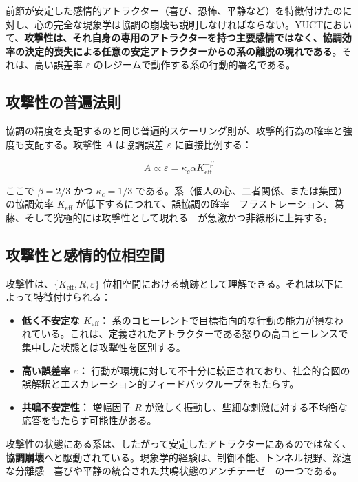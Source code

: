 \documentclass[12pt,a4paper]{article}
\begin{document}
	前節が安定した感情的アトラクター（喜び、恐怖、平静など）を特徴付けたのに対し、心の完全な現象学は協調の崩壊も説明しなければならない。YUCTにおいて、\textbf{攻撃性は、それ自身の専用のアトラクターを持つ主要感情ではなく、協調効率の決定的喪失による任意の安定アトラクターからの系の離脱の現れである}。それは、高い誤差率 \(\varepsilon\) のレジームで動作する系の行動的署名である。
	
	\subsection{攻撃性の普遍法則}
	
	協調の精度を支配するのと同じ普遍的スケーリング則が、攻撃的行為の確率と強度も支配する。攻撃性 \(A\) は協調誤差 \(\varepsilon\) に直接比例する：
	
	\begin{equation}
		A \propto \varepsilon = \kappa_c \alpha K_{\mathrm{eff}}^{-\beta}
	\end{equation}
	
	ここで \(\beta = 2/3\) かつ \(\kappa_c = 1/3\) である。系（個人の心、二者関係、または集団）の協調効率 \(K_{\mathrm{eff}}\) が低下するにつれて、誤協調の確率—フラストレーション、葛藤、そして究極的には攻撃性として現れる—が急激かつ非線形に上昇する。
	
	\subsection{攻撃性と感情的位相空間}
	
	攻撃性は、\(\{K_{\mathrm{eff}}, R, \varepsilon\}\) 位相空間における軌跡として理解できる。それは以下によって特徴付けられる：
	
	\begin{itemize}
		\item \textbf{低く不安定な \(K_{\mathrm{eff}}\)：} 系のコヒーレントで目標指向的な行動の能力が損なわれている。これは、定義されたアトラクターである怒りの高コヒーレンスで集中した状態とは攻撃性を区別する。
		\item \textbf{高い誤差率 \(\varepsilon\)：} 行動が環境に対して不十分に較正されており、社会的合図の誤解釈とエスカレーション的フィードバックループをもたらす。
		\item \textbf{共鳴不安定性：} 増幅因子 \(R\) が激しく振動し、些細な刺激に対する不均衡な応答をもたらす可能性がある。
	\end{itemize}
	
	攻撃性の状態にある系は、したがって安定したアトラクターにあるのではなく、\textbf{協調崩壊}へと駆動されている。現象学的経験は、制御不能、トンネル視野、深遠な分離感—喜びや平静の統合された共鳴状態のアンチテーゼ—の一つである。
	
\end{document}
